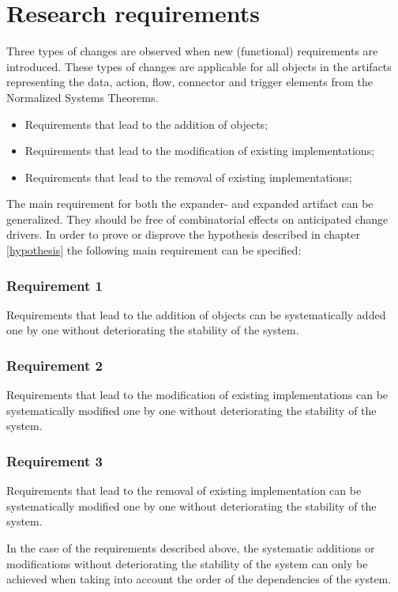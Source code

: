 \section{Research requirements} \label{sec:research_requirements} 

Three types of changes are observed when new (functional) requirements are
introduced. These types of changes are applicable for all objects in the artifacts
representing the data, action, flow, connector and trigger elements from the Normalized
Systems Theorems.
\begin{itemize}
    \item Requirements that lead to the addition of objects;
    \item Requirements that lead to the modification of existing implementations;
    \item Requirements that lead to the removal of existing implementations;
\end{itemize} 

The main requirement for both the expander- and expanded artifact can be generalized. They
should be free of combinatorial effects on anticipated change drivers. In order to prove
or disprove the hypothesis described in chapter \ref{hypothesis} the following main
requirement can be specified:

\subsubsection*{Requirement 1}
Requirements that lead to the addition of objects can be systematically added one by one
without deteriorating the stability of the system.

\subsubsection*{Requirement 2}
Requirements that lead to the modification of existing implementations can be
systematically modified one by one without deteriorating the stability of the system.

\subsubsection*{Requirement 3}
Requirements that lead to the removal of existing implementation can be systematically
modified one by one without deteriorating the stability of the system.

In the case of the requirements described above, the systematic additions or modifications
without deteriorating the stability of the system can only be achieved when taking into
account the order of the dependencies of the system.